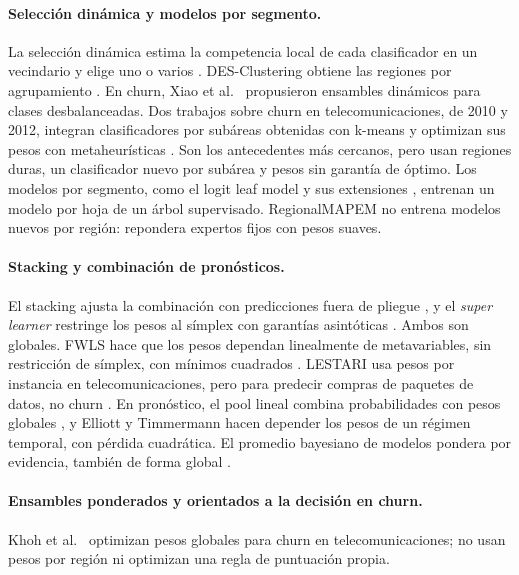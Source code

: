 \documentclass[11pt,a4paper]{article}
\begin{document}
\paragraph{Selección dinámica y modelos por segmento.} La selección dinámica estima la competencia local de cada clasificador en un vecindario y elige uno o varios \cite{woods1997,ko2008,cruz2018}. DES-Clustering obtiene las regiones por agrupamiento \cite{soares2006}. En churn, Xiao et al.\ \cite{xiao2012} propusieron ensambles dinámicos para clases desbalanceadas. Dos trabajos sobre churn en telecomunicaciones, de 2010 y 2012, integran clasificadores por subáreas obtenidas con k-means y optimizan sus pesos con metaheurísticas \cite{xia2010,xia2012}. Son los antecedentes más cercanos, pero usan regiones duras, un clasificador nuevo por subárea y pesos sin garantía de óptimo. Los modelos por segmento, como el logit leaf model y sus extensiones \cite{decaigny2018,decaigny2021}, entrenan un modelo por hoja de un árbol supervisado. RegionalMAPEM no entrena modelos nuevos por región: repondera expertos fijos con pesos suaves.

\paragraph{Stacking y combinación de pronósticos.} El stacking ajusta la combinación con predicciones fuera de pliegue \cite{wolpert1992,breiman1996}, y el \emph{super learner} restringe los pesos al símplex con garantías asintóticas \cite{vanderlaan2007}. Ambos son globales. FWLS hace que los pesos dependan linealmente de metavariables, sin restricción de símplex, con mínimos cuadrados \cite{sill2009}. LESTARI usa pesos por instancia en telecomunicaciones, pero para predecir compras de paquetes de datos, no churn \cite{arifin2025}. En pronóstico, el pool lineal combina probabilidades con pesos globales \cite{ranjan2010}, y Elliott y Timmermann \cite{elliott2005} hacen depender los pesos de un régimen temporal, con pérdida cuadrática. El promedio bayesiano de modelos pondera por evidencia, también de forma global \cite{hoeting1999}.

\paragraph{Ensambles ponderados y orientados a la decisión en churn.} Khoh et al.\ \cite{khoh2023} optimizan pesos globales para churn en telecomunicaciones; no usan pesos por región ni optimizan una regla de puntuación propia.
\end{document}
